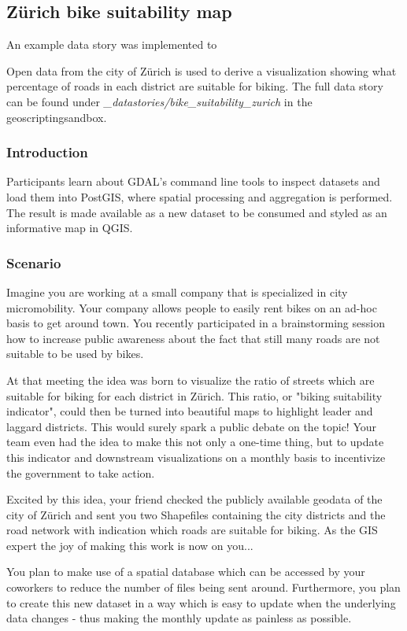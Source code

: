 \documentclass[11pt, a4paper, oneside, parskip=full-]{scrartcl}
\begin{document}
\subsection{Zürich bike suitability map}
An example data story was implemented to

Open data from the city of Zürich is used to derive a visualization showing what
percentage of roads in each district are suitable for biking. The full data
story can be found under \emph{\_datastories/bike\_suitability\_zurich} in the
geoscriptingsandbox.

\subsubsection*{Introduction}

Participants learn about GDAL's command line tools to inspect datasets and load
them into PostGIS, where spatial processing and aggregation is performed. The
result is made available as a new dataset to be consumed and styled as an
informative map in QGIS.

\subsubsection*{Scenario}

Imagine you are working at a small company that is specialized in city
micromobility. Your company allows people to easily rent bikes on an ad-hoc
basis to get around town. You recently participated in a brainstorming session
how to increase public awareness about the fact that still many roads are not
suitable to be used by bikes.

At that meeting the idea was born to visualize the ratio of streets which are
suitable for biking for each district in Zürich. This ratio, or "biking
suitability indicator", could then be turned into beautiful maps to highlight
leader and laggard districts. This would surely spark a public debate on the
topic! Your team even had the idea to make this not only a one-time thing, but
to update this indicator and downstream visualizations on a monthly basis to
incentivize the government to take action.

Excited by this idea, your friend checked the publicly available geodata of the
city of Zürich and sent you two Shapefiles containing the city districts and the
road network with indication which roads are suitable for biking. As the GIS
expert the joy of making this work is now on you...

You plan to make use of a spatial database which can be accessed by your
coworkers to reduce the number of files being sent around. Furthermore, you plan
to create this new dataset in a way which is easy to update when the underlying
data changes - thus making the monthly update as painless as possible.
\end{document}
